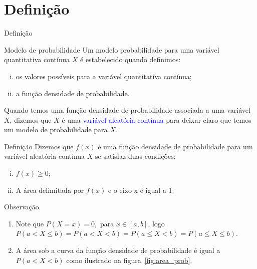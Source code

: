 \documentclass[9pt]{beamer}
\begin{document}
\section{Definição}
\begin{frame}{Definição}

{\scriptsize
\begin{block}{Modelo de probabilidade}
	Um modelo probabilidade para uma variável quantitativa contínua $X$ é estabelecido quando definimos:
	\begin{enumerate}[i.]
		\item os valores possíveis para a variável quantitativa contínua;
		\item a função densidade de probabilidade. 
	\end{enumerate}
	Quando temos uma função densidade de probabilidade associada a uma variável $X$, dizemos que $X$ é uma \textcolor{blue}{variável aleatória contínua} para deixar claro que temos um modelo de probabilidade para $X$.
\end{block}
\vfill

\begin{block}{Definição}
 Dizemos que $f(x)$ é uma função densidade de probabilidade para um variável aleatória contínua $X$ se satisfaz duas condições:
 \begin{enumerate}[i.]
  \item $f(x) \geq 0$;
  \item A área delimitada por $f(x)$ e o eixo x é igual a 1.
 \end{enumerate} 
\end{block}
\vfill

\begin{block}{Observação}
 \begin{enumerate}[1)]
  \item Note que $P(X=x)=0,$ para $x\in [a,b]$, logo $P(a < X \leq b) = P(a < X <b) = P(a \leq X <b) = P(a \leq X \leq b)$.
  \item A área sob a curva da função densidade de probabilidade é igual a $P(a < X < b)$ como ilustrado na figura~\ref{fig:area_prob}.
 \end{enumerate}
\end{block}
}
\end{frame}
\end{document}
